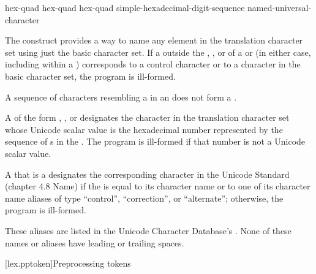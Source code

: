 \begin{bnf}
\br
     hex-quad\br
     hex-quad hex-quad\br
     simple-hexadecimal-digit-sequence \terminal{\}}\br
    named-universal-character
\end{bnf}

\pnum
The  construct provides a way to name any
element in the translation character set using just the basic character set.
If a  outside
the , , or
 of
a  or 
(in either case, including within a )
corresponds to a control character or
to a character in the basic character set, the program is ill-formed.
\begin{note}
A sequence of characters resembling a  in an
 does not form a
.
\end{note}

\pnum
A 
of the form  ,
  , or
designates the character in the translation character set
whose Unicode scalar value is the hexadecimal number represented by
the sequence of s
in the .
The program is ill-formed if that number is not a Unicode scalar value.

\pnum
A 
that is a 
designates the corresponding character
in the Unicode Standard (chapter 4.8 Name)
if the  is equal
to its character name or
to one of its character name aliases of
type ``control'', ``correction'', or ``alternate'';
otherwise, the program is ill-formed.
\begin{note}
These aliases are listed in
the Unicode Character Database's .
None of these names or aliases have leading or trailing spaces.
\end{note}

[lex.pptoken]{Preprocessing tokens}

